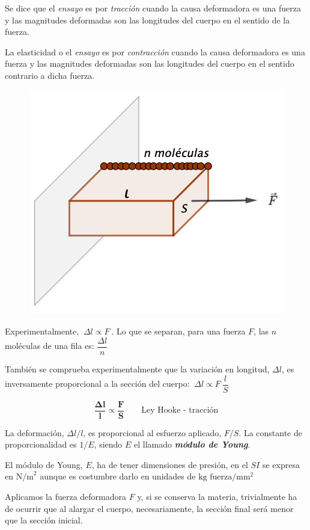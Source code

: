 \begin{multicols}{2}

Se dice que el \emph{ensayo} es por \emph{tracción} cuando la causa deformadora es una fuerza y las magnitudes deformadas son las longitudes del cuerpo en el sentido de la fuerza.

La elasticidad o el \emph{ensayo} es por \emph{contracción} cuando la causa deformadora es una fuerza y las magnitudes deformadas son las longitudes del cuerpo en el sentido contrario a dicha fuerza.
\begin{figure}[H]
	\centering
	\includegraphics[width=.4\textwidth]{imagenes/imagenes09/T09IM02.png}
\end{figure}
\end{multicols}

Experimentalmente, $\ \Delta l \propto F \ $. Lo que se separan, para una fuerza $F$, las $n$ moléculas de una fila es: $\dfrac {\Delta l}{n}$ 

También se comprueba experimentalmente que la variación en longitud, $\Delta l$, es inversamente proporcional a la sección del cuerpo: $\ \Delta l \propto F \ \dfrac{l}{S}$ 

\begin{equation}
 \boldsymbol{\dfrac {\Delta l}{l} \propto \dfrac F S} \qquad \text{Ley Hooke - tracción}	
\end{equation}

La deformación, $\Delta l / l$, es proporcional al esfuerzo aplicado, $F/S$. La constante de proporcionalidad es $1/E$, siendo $E$ el llamado \textbf{\emph{módulo de Young}}.

El módulo de Young, $E$, ha de tener dimensiones de presión, en el $SI$ se expresa en $\mathrm{N/m}^2$ aunque es costumbre darlo en unidades de $\mathrm{kg} \text{ fuerza}/\mathrm{mm}^2$

Aplicamos la fuerza deformadora $F$ y, si se conserva la materia, trivialmente ha de ocurrir que al alargar el cuerpo, necesariamente, la sección final será menor que la sección inicial.

